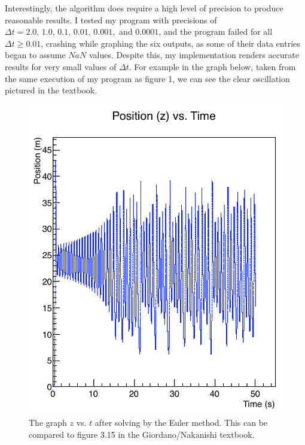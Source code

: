 \documentclass[12pt]{amsart}
\begin{document}
Interestingly, the algorithm does require a high level of precision to produce reasonable results. I tested my program with precisions of 
$\Delta t = 2.0, \, 1.0, \, 0.1, \, 0.01, \, 0.001,$ and $0.0001$, and the program failed for all $\Delta t \geq 0.01$, crashing while graphing the six
outputs, as some of their data entries began to assume $NaN$ values. Despite this, my implementation renders
accurate results for very small values of $\Delta t$. For example in the graph below, taken from the same execution of my program as figure 1,
we can see the clear oscillation pictured in the textbook.
\begin{figure}[h]
	\begin{center}
		\includegraphics[scale=0.65]{fig-2.png}
	\end{center}
	\caption{The graph $z$ vs. $t$ after solving by the Euler method. This can be compared to figure 3.15 in the Giordano/Nakanishi textbook.}
\end{figure}
\end{document}

